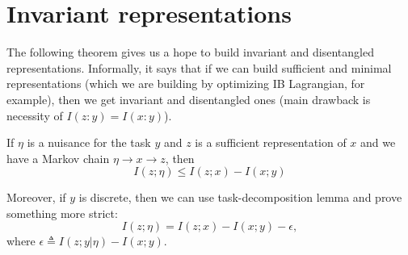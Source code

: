 \documentclass{article}
\begin{document}
\section{Invariant representations}

The following theorem gives us a hope to build invariant and disentangled representations.
Informally, it says that if we can build sufficient and minimal representations (which we are building by optimizing IB Lagrangian, for example), then we get invariant and disentangled ones (main drawback is necessity of $I(z:y) = I(x:y)$).

\begin{proposition}
If $\eta$ is a nuisance for the task $y$ and $z$ is a sufficient representation of $x$ and we have a Markov chain $\eta \to x \to z$, then
\[
I(z;\eta) \leq I(z;x) - I(x;y)
\]

Moreover, if $y$ is discrete, then we can use task-decomposition lemma and prove something more strict:
\[
I(z;\eta) = I(z;x) - I(x;y) - \epsilon,
\]
where $\epsilon \triangleq I(z; y|\eta) - I(x;y)$.
\end{proposition}
\end{document}
